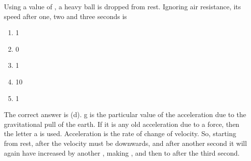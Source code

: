 
\begin{problem}[Robin4]
{Using a value of , a heavy ball is dropped from rest. Ignoring air resistance, its speed after one, two and three seconds is
\begin{enumerate}
	\item 1   
	\item 0   
	\item 1   
	\item 10    \answer
	\item 1   
\end{enumerate}
}
{}
{The correct answer is (d).    g is the particular value of the acceleration due to the gravitational pull of the earth. If it is any old acceleration due to a force, then the letter a is used. Acceleration is the rate of change of velocity. So, starting from rest, after  the velocity must be  downwards, and after another second it will again have increased by another , making , and then to  after the third second. }
\end{problem}